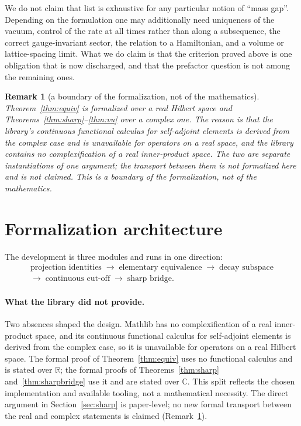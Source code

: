 \documentclass[11pt]{article}
\newtheorem{remark}[theorem]{Remark}
\theoremstyle{definition}
\newcommand{\R}{\mathbb{R}}
\newcommand{\C}{\mathbb{C}}
\begin{document}
We do not claim that list is exhaustive for any particular notion of
``mass gap''.  Depending on the formulation one may additionally need
uniqueness of the vacuum, control of the rate at all times rather than
along a subsequence, the correct gauge-invariant sector, the relation to
a Hamiltonian, and a volume or lattice-spacing limit.  What we do claim
is that the criterion proved above is one obligation that is now
discharged, and that the prefactor question is not among the remaining
ones.

\begin{remark}[a boundary of the formalization, not of the mathematics]
\label{rem:RC}
Theorem~\ref{thm:equiv} is formalized over a real Hilbert space and
Theorems~\ref{thm:sharp}--\ref{thm:vu} over a complex one.  The reason is
that the library's continuous functional calculus for self-adjoint
elements is derived from the complex case and is unavailable for
operators on a real space, and the library contains no complexification
of a real inner-product space.  The two are separate instantiations of
one argument; the transport between them is not formalized here and is
not claimed.  This is a boundary of the formalization, not of the
mathematics.
\end{remark}

\section{Formalization architecture}
\label{sec:arch}

The development is three modules and runs in one direction:
\begin{gather*}
\text{projection identities}
\;\to\;
\text{elementary equivalence}
\;\to\;
\text{decay subspace}\\
\to\;
\text{continuous cut-off}
\;\to\;
\text{sharp bridge.}
\end{gather*}

\paragraph{What the library did not provide.}  Two absences shaped the
design.  Mathlib has no complexification of a real inner-product space,
and its continuous functional calculus for self-adjoint elements is
derived from the complex case, so it is unavailable for operators on a
real Hilbert space.  The formal proof of Theorem~\ref{thm:equiv} uses
no functional calculus and is stated over $\R$; the formal proofs of
Theorems~\ref{thm:sharp} and~\ref{thm:sharpbridge} use it and are stated
over $\C$.  This split reflects the chosen implementation and available
tooling, not a mathematical necessity.  The direct argument in
Section~\ref{sec:sharp} is paper-level; no new formal transport between
the real and complex statements is claimed (Remark~\ref{rem:RC}).
\end{document}
